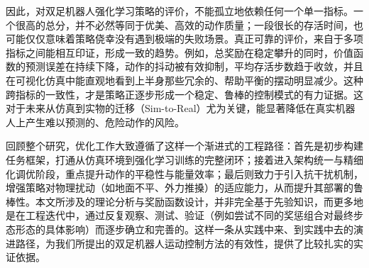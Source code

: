 因此，对双足机器人强化学习策略的评价，不能孤立地依赖任何一个单一指标。一个很高的总分，并不必然等同于优美、高效的动作质量；一段很长的存活时间，也可能仅仅意味着策略侥幸没有遇到极端的失败场景。真正可靠的评价，来自于多项指标之间能相互印证，形成一致的趋势。例如，总奖励在稳定攀升的同时，价值函数的预测误差在持续下降，动作的抖动被有效抑制，平均存活步数趋于收敛，并且在可视化仿真中能直观地看到上半身那些冗余的、帮助平衡的摆动明显减少。这种跨指标的一致性，才是策略正逐步形成一个稳定、鲁棒的控制模式的有力证据。这对于未来从仿真到实物的迁移（Sim-to-Real）尤为关键，能显著降低在真实机器人上产生难以预测的、危险动作的风险。

回顾整个研究，优化工作大致遵循了这样一个渐进式的工程路径：首先是初步构建任务框架，打通从仿真环境到强化学习训练的完整闭环；接着进入架构统一与精细化调优阶段，重点提升动作的平稳性与能量效率；最后则致力于引入抗干扰机制，增强策略对物理扰动（如地面不平、外力推搡）的适应能力，从而提升其部署的鲁棒性。本文所涉及的理论分析与奖励函数设计，并非完全基于先验知识，而更多地是在工程迭代中，通过反复观察、测试、验证（例如尝试不同的奖惩组合对最终步态形态的具体影响）而逐步确立和完善的。这样一条从实践中来、到实践中去的演进路径，为我们所提出的双足机器人运动控制方法的有效性，提供了比较扎实的实证依据。